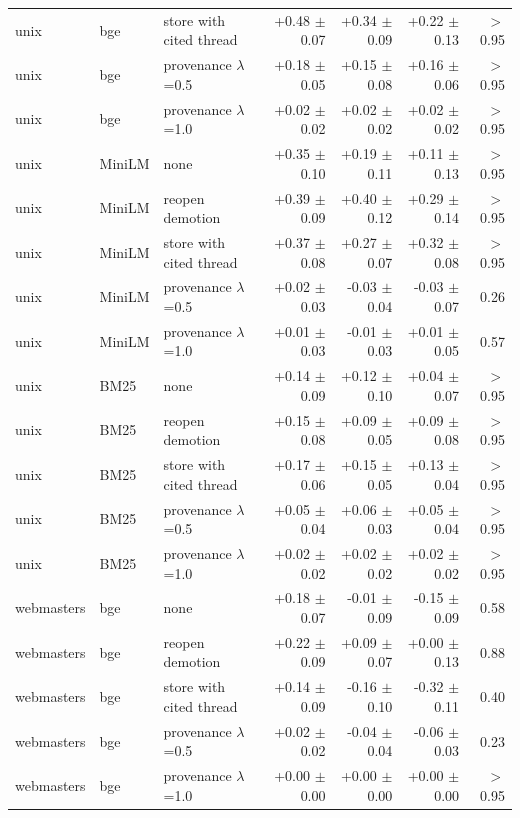 \begin{tabular}{lllrrrr}
unix & bge & store with cited thread & +0.48 $\pm$ 0.07 & +0.34 $\pm$ 0.09 & +0.22 $\pm$ 0.13 & $>$0.95 \\
unix & bge & provenance $\lambda$=0.5 & +0.18 $\pm$ 0.05 & +0.15 $\pm$ 0.08 & +0.16 $\pm$ 0.06 & $>$0.95 \\
unix & bge & provenance $\lambda$=1.0 & +0.02 $\pm$ 0.02 & +0.02 $\pm$ 0.02 & +0.02 $\pm$ 0.02 & $>$0.95 \\
\midrule
unix & MiniLM & none & +0.35 $\pm$ 0.10 & +0.19 $\pm$ 0.11 & +0.11 $\pm$ 0.13 & $>$0.95 \\
unix & MiniLM & reopen demotion & +0.39 $\pm$ 0.09 & +0.40 $\pm$ 0.12 & +0.29 $\pm$ 0.14 & $>$0.95 \\
unix & MiniLM & store with cited thread & +0.37 $\pm$ 0.08 & +0.27 $\pm$ 0.07 & +0.32 $\pm$ 0.08 & $>$0.95 \\
unix & MiniLM & provenance $\lambda$=0.5 & +0.02 $\pm$ 0.03 & -0.03 $\pm$ 0.04 & -0.03 $\pm$ 0.07 & 0.26 \\
unix & MiniLM & provenance $\lambda$=1.0 & +0.01 $\pm$ 0.03 & -0.01 $\pm$ 0.03 & +0.01 $\pm$ 0.05 & 0.57 \\
\midrule
unix & BM25 & none & +0.14 $\pm$ 0.09 & +0.12 $\pm$ 0.10 & +0.04 $\pm$ 0.07 & $>$0.95 \\
unix & BM25 & reopen demotion & +0.15 $\pm$ 0.08 & +0.09 $\pm$ 0.05 & +0.09 $\pm$ 0.08 & $>$0.95 \\
unix & BM25 & store with cited thread & +0.17 $\pm$ 0.06 & +0.15 $\pm$ 0.05 & +0.13 $\pm$ 0.04 & $>$0.95 \\
unix & BM25 & provenance $\lambda$=0.5 & +0.05 $\pm$ 0.04 & +0.06 $\pm$ 0.03 & +0.05 $\pm$ 0.04 & $>$0.95 \\
unix & BM25 & provenance $\lambda$=1.0 & +0.02 $\pm$ 0.02 & +0.02 $\pm$ 0.02 & +0.02 $\pm$ 0.02 & $>$0.95 \\
\midrule
webmasters & bge & none & +0.18 $\pm$ 0.07 & -0.01 $\pm$ 0.09 & -0.15 $\pm$ 0.09 & 0.58 \\
webmasters & bge & reopen demotion & +0.22 $\pm$ 0.09 & +0.09 $\pm$ 0.07 & +0.00 $\pm$ 0.13 & 0.88 \\
webmasters & bge & store with cited thread & +0.14 $\pm$ 0.09 & -0.16 $\pm$ 0.10 & -0.32 $\pm$ 0.11 & 0.40 \\
webmasters & bge & provenance $\lambda$=0.5 & +0.02 $\pm$ 0.02 & -0.04 $\pm$ 0.04 & -0.06 $\pm$ 0.03 & 0.23 \\
webmasters & bge & provenance $\lambda$=1.0 & +0.00 $\pm$ 0.00 & +0.00 $\pm$ 0.00 & +0.00 $\pm$ 0.00 & $>$0.95 \\

\end{tabular}

